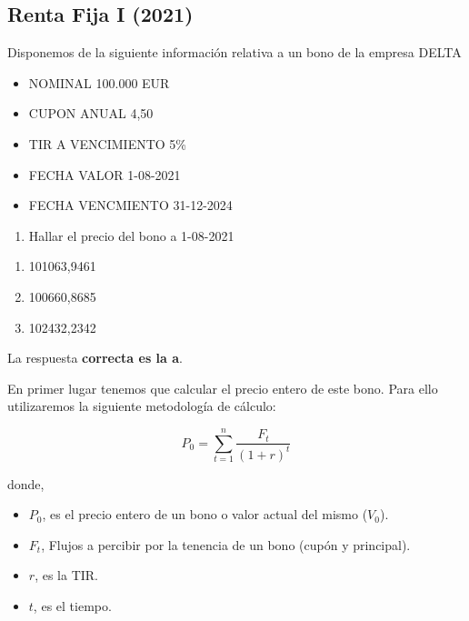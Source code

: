 \documentclass[
  letterpaper,
  DIV=11,
  numbers=noendperiod]{scrreprt}
\providecommand{\tightlist}{%
  \setlength{\itemsep}{0pt}\setlength{\parskip}{0pt}}\usepackage{longtable,booktabs,array}
\begin{document}
\begin{tcolorbox}
\subsection{Renta Fija I (2021)}\label{renta-fija-i-2021-1}

Disponemos de la siguiente información relativa a un bono de la empresa
DELTA

\begin{itemize}
\tightlist
\item
  NOMINAL 100.000 EUR
\item
  CUPON ANUAL 4,50
\item
  TIR A VENCIMIENTO 5\%
\item
  FECHA VALOR 1-08-2021
\item
  FECHA VENCMIENTO 31-12-2024
\end{itemize}

\begin{enumerate}
\def\labelenumi{\arabic{enumi}.}
\tightlist
\item
  Hallar el precio del bono a 1-08-2021
\end{enumerate}

\begin{enumerate}
\def\labelenumi{\alph{enumi}.}
\item
  101063,9461
\item
  100660,8685
\item
  102432,2342
\end{enumerate}

\begin{tcolorbox}[enhanced jigsaw, toprule=.15mm, left=2mm, breakable, opacitybacktitle=0.6, toptitle=1mm, coltitle=black, arc=.35mm, leftrule=.75mm, bottomtitle=1mm, titlerule=0mm, title=\textcolor{quarto-callout-tip-color}{\faLightbulb}\hspace{0.5em}{Solución}, rightrule=.15mm, opacityback=0, bottomrule=.15mm, colback=white, colframe=quarto-callout-tip-color-frame, colbacktitle=quarto-callout-tip-color!10!white]

La respuesta \textbf{correcta es la a}.

En primer lugar tenemos que calcular el precio entero de este bono. Para
ello utilizaremos la siguiente metodología de cálculo:

\[P_0=\sum_{ t=1}^{ n}\frac{F_t}{(1+r)^{t}}\]

donde,

\begin{itemize}
\item
  \(P_0\), es el precio entero de un bono o valor actual del mismo
  (\(V_0\)).
\item
  \(F_t\), Flujos a percibir por la tenencia de un bono (cupón y
  principal).
\item
  \(r\), es la TIR.
\item
  \(t\), es el tiempo.
\end{itemize}


\end{tcolorbox}
\end{tcolorbox}
\end{document}
